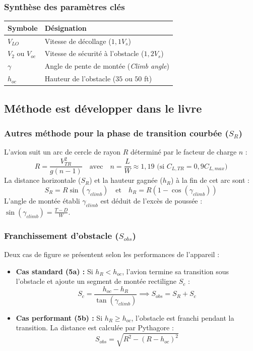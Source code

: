  		\subsubsection{Synthèse des paramètres clés}
 		\begin{tabular}{|l|l|}
 			\hline
 			\textbf{Symbole} & \textbf{Désignation}  \\ \hline
 			$V_{LO}$ & Vitesse de décollage ($1,1 V_s$) \\ \hline
 			$V_2$ ou $V_{oc}$ & Vitesse de sécurité à l'obstacle ($1,2 V_s$)  \\ \hline
 			$\gamma$ & Angle de pente de montée (\textit{Climb angle})  \\ \hline
 			$h_{oc}$ & Hauteur de l'obstacle ($35$ ou $50$ ft)  \\ \hline
 		\end{tabular}
 		
 	
 		
 		\subsection{Méthode est développer dans le livre \cite{smi:60}}
 		\subsubsection{ Autres méthode pour la phase de transition courbée ($S_R$)}
 		
 		
 		L'avion suit un arc de cercle de rayon $R$ déterminé par le facteur de charge $n$ :
 		\[
 		R = \frac{V_{TR}^2}{g(n - 1)} \quad \text{avec} \quad n = \frac{L}{W} \approx 1,19 \text{ (si } C_{L,TR} = 0,9 C_{L,max}\text{)} 
 		\]
 		La distance horizontale ($S_R$) et la hauteur gagnée ($h_R$) à la fin de cet arc sont :
 		\[
 		S_R = R \sin(\gamma_{climb}) \quad \text{et} \quad h_R = R(1 - \cos(\gamma_{climb})) 
 		\]
 		L'angle de montée établi $\gamma_{climb}$ est déduit de l'excès de poussée : $\sin(\gamma_{climb}) = \frac{T - D}{W}$.
 		
 		\subsubsection { Franchissement d'obstacle ($S_{obs}$)}
 		Deux cas de figure se présentent selon les performances de l'appareil \cite{265} :
 		\begin{itemize}
 			\item \textbf{Cas standard (5a) :} Si $h_R < h_{oc}$, l'avion termine sa transition sous l'obstacle et ajoute un segment de montée rectiligne $S_c$ :
 			\[ S_c = \frac{h_{oc} - h_R}{\tan(\gamma_{climb})} \implies S_{obs} = S_R + S_c \]
 			\item \textbf{Cas performant (5b) :} Si $h_R \geq h_{oc}$, l'obstacle est franchi pendant la transition. La distance est calculée par Pythagore :
 			\[ S_{obs} = \sqrt{R^2 - (R - h_{oc})^2} \]
 		\end{itemize}
 		
 
 	
 		
 			